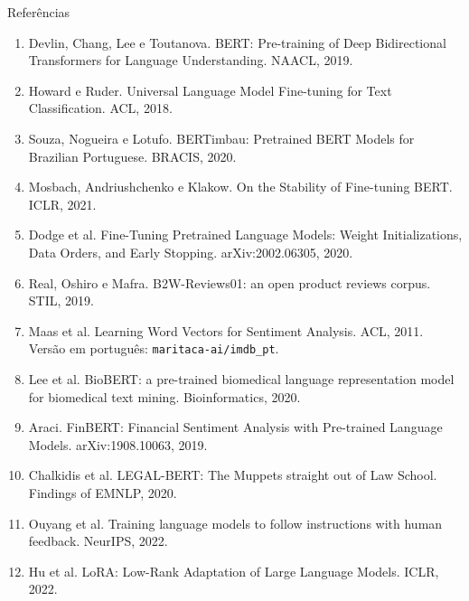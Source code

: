 \documentclass[aspectratio=169,10pt]{beamer}
\begin{document}
\begin{frame}{Referências}
  \scriptsize
  \begin{enumerate}
    \item[{[1]}] Devlin, Chang, Lee e Toutanova. BERT: Pre-training of Deep Bidirectional Transformers for Language Understanding. NAACL, 2019.
    \item[{[2]}] Howard e Ruder. Universal Language Model Fine-tuning for Text Classification. ACL, 2018.
    \item[{[3]}] Souza, Nogueira e Lotufo. BERTimbau: Pretrained BERT Models for Brazilian Portuguese. BRACIS, 2020.
    \item[{[4]}] Mosbach, Andriushchenko e Klakow. On the Stability of Fine-tuning BERT. ICLR, 2021.
    \item[{[5]}] Dodge et al. Fine-Tuning Pretrained Language Models: Weight Initializations, Data Orders, and Early Stopping. arXiv:2002.06305, 2020.
    \item[{[8]}] Real, Oshiro e Mafra. B2W-Reviews01: an open product reviews corpus. STIL, 2019.
    \item[{[9]}] Maas et al. Learning Word Vectors for Sentiment Analysis. ACL, 2011. Versão em português: \texttt{maritaca-ai/imdb\_pt}.
    \item[{[10]}] Lee et al. BioBERT: a pre-trained biomedical language representation model for biomedical text mining. Bioinformatics, 2020.
    \item[{[11]}] Araci. FinBERT: Financial Sentiment Analysis with Pre-trained Language Models. arXiv:1908.10063, 2019.
    \item[{[12]}] Chalkidis et al. LEGAL-BERT: The Muppets straight out of Law School. Findings of EMNLP, 2020.
    \item[{[13]}] Ouyang et al. Training language models to follow instructions with human feedback. NeurIPS, 2022.
    \item[{[14]}] Hu et al. LoRA: Low-Rank Adaptation of Large Language Models. ICLR, 2022.
  \end{enumerate}
\end{frame}
\end{document}
